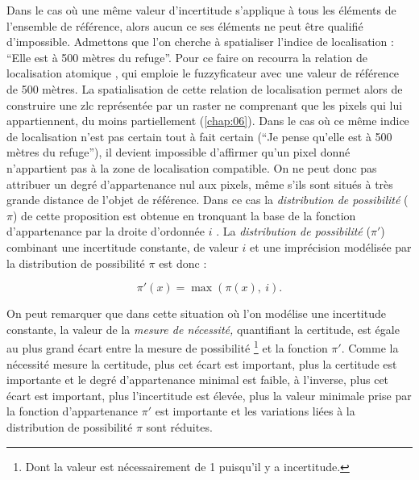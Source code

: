 {Dans le cas où une même valeur d'incertitude s'applique à tous les
éléments de l'ensemble de référence, alors aucun ce ses éléments ne
peut être qualifié d'impossible.
%
Admettons que l'on cherche à spatialiser l'indice de localisation :
\enquote{Elle est à 500 mètres du refuge}. Pour ce faire on recourra
la relation de localisation atomique
, qui emploie le fuzzyficateur
 avec une valeur de référence de 500 mètres. La
spatialisation de cette relation de localisation permet alors de
construire une \ac{zlc} représentée par un raster ne comprenant que
les pixels qui lui appartiennent, du moins partiellement
(\autoref{chap:06}). Dans le cas où ce même indice de localisation
n'est pas certain tout à fait certain (\eg \enquote{Je pense qu'elle
  est à 500 mètres du refuge}), il devient impossible d'affirmer qu'un
pixel donné n'appartient pas à la zone de localisation compatible. On
ne peut donc pas attribuer un degré d'appartenance nul aux pixels,
même s'ils sont situés à très grande distance de l'objet de
référence. Dans ce cas la \emph{distribution de possibilité} (\(π\))
de cette proposition est obtenue en tronquant la base de la fonction
d'appartenance par la droite d'ordonnée \(i\)
\autocite{Bouchon-Meunier2007}. La \emph{distribution de possibilité}
(\(π'\)) combinant une incertitude constante, de valeur \(i\) et une
imprécision modélisée par la distribution de possibilité \(\pi\) est
donc :

\begin{equation}
  \label{eq:incert_imp}
  π'(x) = \max(π(x),\ i).  
\end{equation}

On peut remarquer que dans cette situation où l'on modélise une
incertitude constante, la valeur de la \emph{mesure de nécessité,}
quantifiant la certitude, est égale au plus grand écart entre la
mesure de possibilité \footnote{Dont la valeur est nécessairement de 1
  puisqu’il y a incertitude.} et la fonction \(\pi'\). Comme la
nécessité mesure la certitude, plus cet écart est important, plus la
certitude est importante et le degré d'appartenance minimal est
faible, à l'inverse, plus cet écart est important, plus l'incertitude
est élevée, plus la valeur minimale prise par la fonction
d'appartenance \(\pi'\) est importante et les variations liées à la
distribution de possibilité \(\pi\) sont réduites.

}
